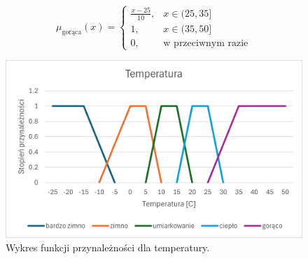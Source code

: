 \documentclass{article}
\begin{document}
\begin{enumerate}
                \begin{equation}
                    \mu_{\text{gorąca}}(x) =
                    \begin{cases}
                    \frac{x - 25}{10}, & x \in (25, 35] \\
                    1, & x \in (35, 50] \\
                    0, & \text{w przeciwnym razie}
                    \end{cases}
                \end{equation}

        \begin{figure}[H]
    \centering
    \includegraphics[width=\textwidth]{img/temp.png}
    \caption{Wykres funkcji przynależności dla temperatury.}
    \end{figure}


\end{enumerate}
\end{document}

